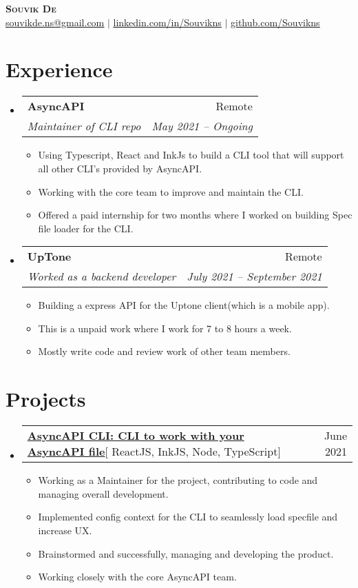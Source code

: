 \documentclass[letterpaper,11pt]{article}
\makeatletter
\newcommand{\resumeItem}[1]{
  \item\small{
    {#1 \vspace{-2pt}}
  }
}
\newcommand{\resumeSubheading}[4]{
  \vspace{-2pt}\item
    \begin{tabular*}{0.97\textwidth}[t]{l@{\extracolsep{\fill}}r}
      \textbf{#1} & #2 \\
      \textit{\small#3} & \textit{\small #4} \\
    \end{tabular*}\vspace{-7pt}
}
\newcommand{\resumeSubSubheading}[2]{
    \item
    \begin{tabular*}{0.97\textwidth}{l@{\extracolsep{\fill}}r}
      \textit{\small#1} & \textit{\small #2} \\
    \end{tabular*}\vspace{-7pt}
}
\newcommand{\resumeProjectHeading}[2]{
    \item
    \begin{tabular*}{0.97\textwidth}{l@{\extracolsep{\fill}}r}
      \small#1 & #2 \\
    \end{tabular*}\vspace{-7pt}
}
\newcommand{\resumeSubHeadingListStart}{\begin{itemize}[leftmargin=0.15in, label={}]}
\newcommand{\resumeSubHeadingListEnd}{\end{itemize}}
\newcommand{\resumeItemListStart}{\begin{itemize}}
\newcommand{\resumeItemListEnd}{\end{itemize}\vspace{-5pt}}
\makeatother
\begin{document}

\begin{center}
    \textbf{\Huge \scshape Souvik De} \\ \vspace{1pt}
    \href{mailto:souvikde.ns@gmail.com}{\underline{souvikde.ns@gmail.com}} $|$ 
    \href{https://www.linkedin.com/in/souvik-de-a2b941169/}{\underline{linkedin.com/in/Souvikns}} $|$
    \href{https://github.com/Souvikns}{\underline{github.com/Souvikns}}
\end{center}


\section{Experience}
  \resumeSubHeadingListStart

    \resumeSubheading
      {AsyncAPI}{Remote}
      {Maintainer of CLI repo}{May 2021 -- Ongoing}
      \resumeItemListStart
         \resumeItem{Using Typescript, React and InkJs to build a CLI tool that will support all other CLI's provided by AsyncAPI. }
         \resumeItem{Working with the core team to improve and maintain the CLI.}
         \resumeItem{Offered a paid internship for two months where I worked on building Spec file loader for the CLI.}
     \resumeItemListEnd
     
     \resumeSubheading
     {UpTone}{Remote}
      {Worked as a backend developer}{July 2021 -- September 2021}
      \resumeItemListStart
         \resumeItem{Building a express API for the Uptone client(which is a mobile app). }
         \resumeItem{This is a unpaid work where I work for 7 to 8 hours a week.}
         \resumeItem{Mostly write code and review work of other team members.}
     \resumeItemListEnd

    
  \resumeSubHeadingListEnd
  


\section{Projects}
    \resumeSubHeadingListStart
      \resumeProjectHeading
          {\textbf{\href{https://github.com/asyncapi/cli} {AsyncAPI CLI: CLI to work with your AsyncAPI file}}{[ ReactJS, InkJS, Node, TypeScript]}}{June 2021}
          \resumeItemListStart
            \resumeItem{ Working as a Maintainer for the project, contributing to code and managing overall development.}
            \resumeItem{ Implemented config context for the CLI to seamlessly load specfile and increase UX. }
            \resumeItem{ Brainstormed and successfully, managing and developing the product.}
            \resumeItem{ Working closely with the core AsyncAPI team. }
          \resumeItemListEnd
    \resumeSubHeadingListEnd
    
\end{document}

